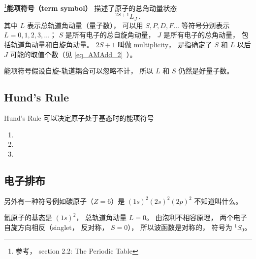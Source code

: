 
\begin{issues}
\issueDraft
\end{issues}


\footnote{参考\cite{GriffQ}， section 2.2: The Periodic Table}\textbf{能项符号（term symbol）} 描述了原子的总角动量状态
\begin{equation}
^{2S + 1} L_J~.
\end{equation}
其中 $L$ 表示总轨道角动量（量子数）， 可以用 $S, P, D, F \dots$ 等符号分别表示 $L = 0, 1, 2, 3, \dots$； $S$ 是所有电子的总自旋角动量， $J$ 是所有电子的总角动量， 包括轨道角动量和自旋角动量。 $2S + 1$ 叫做 multiplicity， 是指确定了 $S$ 和 $L$ 以后 $J$ 可能的取值个数（见 \autoref{eq_AMAdd_2}~）。

能项符号假设自旋-轨道耦合可以忽略不计， 所以 $L$ 和 $S$ 仍然是好量子数。

\subsection{Hund's Rule}
Hund's Rule 可以决定原子处于基态时的能项符号
\begin{enumerate}
\item 
\item 
\item 
\end{enumerate}

\subsection{电子排布}
另外有一种符号例如碳原子（$Z = 6$）是 $(1s)^2 (2s)^2 (2p)^2$ 不知道叫什么。

氦原子的基态是 $(1s)^2$， 总轨道角动量 $L = 0$。 由泡利不相容原理， 两个电子自旋方向相反（singlet， 反对称， $S = 0$）， 所以波函数是对称的， 符号为 $^1 S_0$。
